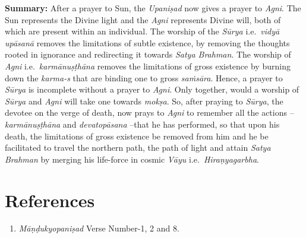 \textbf{Summary:} After a prayer to Sun, the \emph{Upaniṣad} now gives a prayer to \emph{Agni}. The Sun represents the Divine light and the \emph{Agni} represents Divine will, both of which are present within an individual. The worship of the \emph{Sūrya} i.e.\ \emph{vidyā upāsanā} removes the limitations of subtle existence, by removing the thoughts rooted in ignorance and redirecting it towards \emph{Satya Brahman}. The worship of \emph{Agni} i.e.\ \emph{karmānuṣṭhāna} removes the limitations of gross existence by burning down the \emph{karma-s} that are binding one to gross \emph{saṁsāra}. Hence, a prayer to \emph{Sūrya} is incomplete without a prayer to \emph{Agni}. Only together, would a worship of \emph{Sūrya} and \emph{Agni} will take one towards \emph{mokṣa}. So, after praying to \emph{Sūrya}, the devotee on the verge of death, now prays to \emph{Agni} to remember all the actions -- \emph{karmānuṣṭhāna} and \emph{devatopāsana} --that he has performed, so that upon his death, the limitations of gross existence be removed from him and he be facilitated to travel the northern path, the path of light and attain \emph{Satya Brahman} by merging his life-force in cosmic \emph{Vāyu} i.e.\ \emph{Hiraṇyagarbha}.

\section*{References}

\begin{enumerate}
\itemsep=0pt
\item
  \emph{Māṇḍukyopaniṣad} Verse Number-1, 2 and 8.
\end{enumerate}


